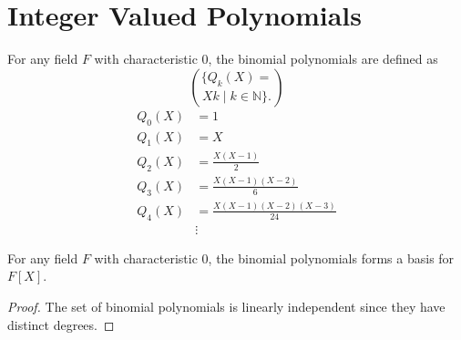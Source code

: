\section{Integer Valued Polynomials}
\label{sec:integer_valued_polynomial}

\begin{definition}
    \label{def:binomial_polynomial}
    \leanok
    For any field $F$ with characteristic $0$, the binomial polynomials are defined as
    $$\{ Q_k(X) = \choose X k \mid k \in \mathbb{N} \}.$$
    \begin{equation}
        \begin{aligned}
            Q_0(X) &= 1 \\
            Q_1(X) &= X \\
            Q_2(X) &= \frac{X(X-1)}{2} \\
            Q_3(X) &= \frac{X(X-1)(X-2)}{6} \\
            Q_4(X) &= \frac{X(X-1)(X-2)(X-3)}{24} \\
            &\vdots
        \end{aligned}
    \end{equation}
\end{definition}

\begin{lemma}
    For any field $F$ with characteristic $0$, the binomial polynomials forms a basis for $F[X]$.
    \leanok
\end{lemma}
\begin{proof}
    The set of binomial polynomials is linearly independent since they have distinct degrees.
\end{proof}


